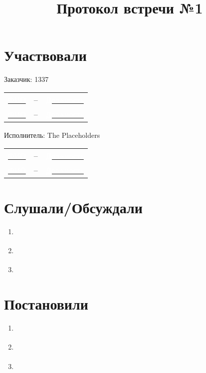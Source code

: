\documentclass{article}
\title{Протокол встречи №1}
\author{\red{Адрес встречи}}
\newcommand{\red}[1]{\uline{\hspace*{1cm}\textcolor{white}{#1}\hspace*{1cm}}}
\newcommand{\fio}{ФИО}
\begin{document}
  \maketitle

  \section{Участвовали}
  Заказчик: 1337 \\
  \begin{tabular}{lll}
    \red{\fio} &--& \red{Должность} \\
    \red{\fio} &--& \red{Должность} \\
  \end{tabular}

  \vspace{.5cm}
  \noindent
  Исполнитель: The Placeholders \\
  \begin{tabular}{lll}
    \red{\fio} &--& \red{Должность} \\
    \red{\fio} &--& \red{Должность} \\
  \end{tabular}

  \section{Слушали/Обсуждали}
  \begin{enumerate}[label=\arabic*)]
    \item \red{\hspace*{5cm}}
    \item \red{\hspace*{5cm}}
    \item \red{\hspace*{5cm}}
  \end{enumerate}

  \section{Постановили}
  \begin{enumerate}[label=\arabic*)]
    \item \red{\hspace*{5cm}}
    \item \red{\hspace*{5cm}}
    \item \red{\hspace*{5cm}}
  \end{enumerate}
\end{document}
